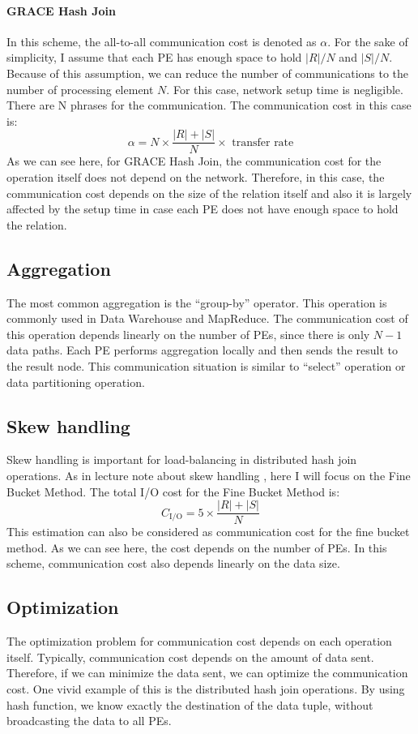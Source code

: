 \documentclass[a4paper,12pt]{article}
\begin{document}
\paragraph{GRACE Hash Join} In this scheme, the all-to-all communication cost is denoted as $\alpha$. For the sake of simplicity, I assume that each PE has enough space to hold $|R|/N$ and $|S|/N$. Because of this assumption, we can reduce the number of communications to the number of processing element $N$. For this case, network setup time is negligible. There are N phrases for the communication. The communication cost in this case is:
$$
\alpha = N \times \frac{|R| + |S|}{N} \times \mbox{ transfer rate}
$$
As we can see here, for GRACE Hash Join, the communication cost for the operation itself does not depend on the network. Therefore, in this case, the communication cost depends on the size of the relation itself and also it is largely affected by the setup time in case each PE does not have enough space to hold the relation.

\subsection{Aggregation}
The most common aggregation is the ``group-by'' operator. This operation is commonly used in Data Warehouse and MapReduce. The communication cost of this operation depends linearly on the number of PEs, since there is only $N-1$ data paths. Each PE performs aggregation locally and then sends the result to the result node. This communication situation is similar to ``select'' operation or data partitioning operation.

\subsection{Skew handling}
Skew handling is important for load-balancing in distributed hash join operations. As in lecture note about skew handling \cite{lec12}, here I will focus on the Fine Bucket Method. The total I/O cost for the Fine Bucket Method is:
$$
C_{\mbox{I/O}} = 5 \times \frac{|R| + |S|}{N}
$$
This estimation can also be considered as communication cost for the fine bucket method. As we can see here, the cost depends on the number of PEs. In this scheme, communication cost also depends linearly on the data size.

\subsection{Optimization}
The optimization problem for communication cost depends on each operation itself. Typically, communication cost depends on the amount of data sent. Therefore, if we can minimize the data sent, we can optimize the communication cost. One vivid example of this is the distributed hash join operations. By using hash function, we know exactly the destination of the data tuple, without broadcasting the data to all PEs.
\end{document}
